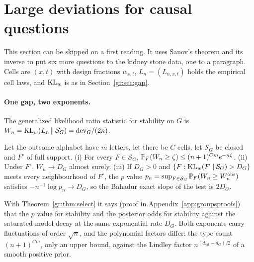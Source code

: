 \section{Large deviations for causal questions}\label{gr:sec:ld}

This section can be skipped on a first reading. It uses Sanov's theorem and its inverse to put six more questions to the kidney stone data, one to a paragraph. Cells are $(x,t)$ with design fractions $w_{x,t}$, $L_n=(L_{n,x,t})$ holds the empirical cell laws, and $\mathrm{KL}_w$ is as in Section~\ref{gr:sec:gap}.

\paragraph{One gap, two exponents.}
The generalized likelihood ratio statistic for stability on $G$ is $W_n=\mathrm{KL}_w(L_n\,\|\,\mathcal S_G)=\mathrm{dev}_G/(2n)$.

\begin{theorem}\label{gr:thm:hoeffding}
Let the outcome alphabet have $m$ letters, let there be $C$ cells, let $\mathcal S_G$ be closed and $F^{\circ}$ of full support. (i) For every $F\in\mathcal S_G$, $\mathbb{P}_F(W_n\ge\zeta)\le(n+1)^{Cm}e^{-n\zeta}$. (ii) Under $F^{\circ}$, $W_n\to D_G$ almost surely. (iii) If $D_G>0$ and $\{F:\mathrm{KL}_w(F\,\|\,\mathcal S_G)>D_G\}$ meets every neighbourhood of $F^{\circ}$, the $p$ value $p_n=\sup_{F\in\mathcal S_G}\mathbb{P}_F(W_n\ge W_n^{\mathrm{obs}})$ satisfies $-n^{-1}\log p_n\to D_G$, so the Bahadur exact slope of the test is $2D_G$.
\end{theorem}

With Theorem~\ref{gr:thm:select} it says (proof in Appendix~\ref{app:groupsproofs}) that the $p$ value for stability and the posterior odds for stability against the saturated model decay at the same exponential rate $D_G$. Both exponents carry fluctuations of order $\sqrt n$, and the polynomial factors differ: the type count $(n+1)^{Cm}$, only an upper bound, against the Lindley factor $n^{(d_{\mathrm{sat}}-d_G)/2}$ of a smooth positive prior.

